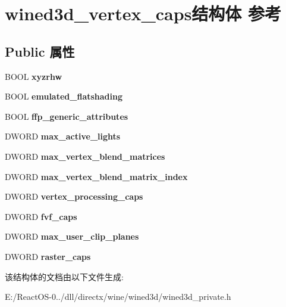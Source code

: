 \hypertarget{structwined3d__vertex__caps}{}\section{wined3d\+\_\+vertex\+\_\+caps结构体 参考}
\label{structwined3d__vertex__caps}
\subsection*{Public 属性}
\begin{DoxyCompactItemize}
\item 
\mbox{\label{structwined3d__vertex__caps_add1c0816a074eaa8e3bcd752e60ef07f}} 
B\+O\+OL {\bfseries xyzrhw}
\item 
\mbox{\label{structwined3d__vertex__caps_a640bcd2e3e8d1260a58940bafec322dc}} 
B\+O\+OL {\bfseries emulated\+\_\+flatshading}
\item 
\mbox{\label{structwined3d__vertex__caps_a8803f8ab47f82a2fb69ccd98ce7f56bc}} 
B\+O\+OL {\bfseries ffp\+\_\+generic\+\_\+attributes}
\item 
\mbox{\label{structwined3d__vertex__caps_ac7a3a9cfbaa0be2f8ac7fbb5c97b5c9d}} 
D\+W\+O\+RD {\bfseries max\+\_\+active\+\_\+lights}
\item 
\mbox{\label{structwined3d__vertex__caps_ab146050f4cd9e723a17cccae597a8da7}} 
D\+W\+O\+RD {\bfseries max\+\_\+vertex\+\_\+blend\+\_\+matrices}
\item 
\mbox{\label{structwined3d__vertex__caps_a9906c59e823328b95d6b78561415c052}} 
D\+W\+O\+RD {\bfseries max\+\_\+vertex\+\_\+blend\+\_\+matrix\+\_\+index}
\item 
\mbox{\label{structwined3d__vertex__caps_a09f4edd06479ba1beb3874fe59da40f7}} 
D\+W\+O\+RD {\bfseries vertex\+\_\+processing\+\_\+caps}
\item 
\mbox{\label{structwined3d__vertex__caps_a4784dbe9522dbe244e927f525093938c}} 
D\+W\+O\+RD {\bfseries fvf\+\_\+caps}
\item 
\mbox{\label{structwined3d__vertex__caps_a1df3f62211520ab60245dc2809f96f4e}} 
D\+W\+O\+RD {\bfseries max\+\_\+user\+\_\+clip\+\_\+planes}
\item 
\mbox{\label{structwined3d__vertex__caps_a6ca4da36d2b38759eacf663e8125f4bd}} 
D\+W\+O\+RD {\bfseries raster\+\_\+caps}
\end{DoxyCompactItemize}


该结构体的文档由以下文件生成\+:\begin{DoxyCompactItemize}
\item 
E\+:/\+React\+O\+S-\/0../dll/directx/wine/wined3d/wined3d\+\_\+private.\+h\end{DoxyCompactItemize}
